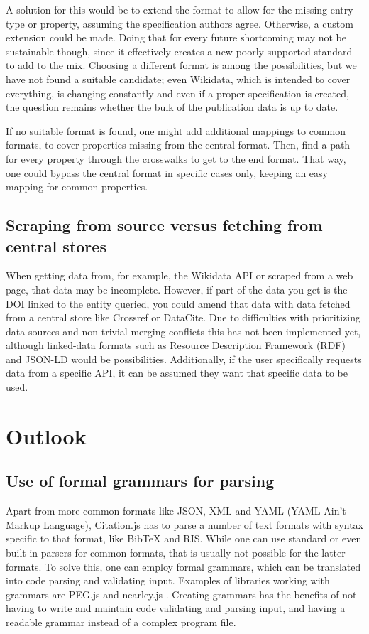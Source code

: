 \documentclass[fleqn,10pt,lineno]{wlpeerj} %
\begin{document}
A solution for this would be to extend the format to allow for the missing entry type or property, assuming the specification authors agree. Otherwise, a custom extension could be made. Doing that for every future shortcoming may not be sustainable though, since it effectively creates a new poorly-supported standard to add to the mix. Choosing a different format is among the possibilities, but we have not found a suitable candidate; even Wikidata, which is intended to cover everything, is changing constantly and even if a proper specification is created, the question remains whether the bulk of the publication data is up to date.

If no suitable format is found, one might add additional mappings to common formats, to cover properties missing from the central format. Then, find a path for every property through the crosswalks to get to the end format. That way, one could bypass the central format in specific cases only, keeping an easy mapping for common properties.

\subsection*{Scraping from source versus fetching from central stores}

When getting data from, for example, the Wikidata API or scraped from a web page, that data may be incomplete. However, if part of the data you get is the DOI linked to the entity queried, you could amend that data with data fetched from a central store like Crossref or DataCite. Due to difficulties with prioritizing data sources and non-trivial merging conflicts this has not been implemented yet, although linked-data formats such as Resource Description Framework (RDF) and JSON-LD would be possibilities. Additionally, if the user specifically requests data from a specific API, it can be assumed they want that specific data to be used.

\section*{Outlook}

\subsection*{Use of formal grammars for parsing}

Apart from more common formats like JSON, XML and YAML (YAML Ain't Markup Language), Citation.js has to parse a number of text formats with syntax specific to that format, like BibTeX and RIS. While one can use standard or even built-in parsers for common formats, that is usually not possible for the latter formats.
To solve this, one can employ formal grammars, which can be translated into code parsing and validating input. Examples of libraries working with grammars are PEG.js \citep{Majda2018pegjs/pegjs} and nearley.js \citep{Kartik2018kach/nearley}. Creating grammars has the benefits of not having to write and maintain code validating and parsing input, and having a readable grammar instead of a complex program file.
\end{document}
